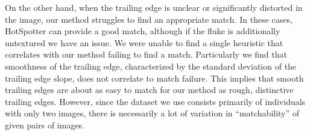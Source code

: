 


On the other hand, when the trailing edge is unclear or significantly distorted in the image, our method struggles to find an appropriate match.
In these cases, HotSpotter can provide a good match, although if the fluke is additionally untextured we have an issue.
We were unable to find a single heuristic that correlates with our method failing to find a match.
Particularly we find that smoothness of the trailing edge, characterized by the standard deviation of the trailing edge slope, does not correlate to match failure.
This implies that smooth trailing edges are about as easy to match for our method as rough, distinctive trailing edges.
However, since the dataset we use consists primarily of individuals with only two images, there is necessarily a lot of variation in ``matchability'' of given pairs of images.



